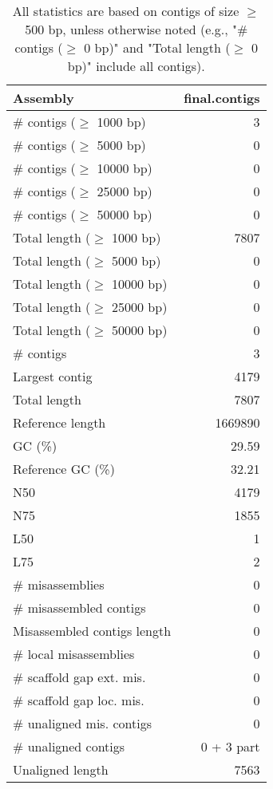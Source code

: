 \documentclass[12pt,a4paper]{article}
\begin{document}
\begin{table}[ht]
\begin{center}
\caption{All statistics are based on contigs of size $\geq$ 500 bp, unless otherwise noted (e.g., "\# contigs ($\geq$ 0 bp)" and "Total length ($\geq$ 0 bp)" include all contigs).}
\begin{tabular}{|l*{1}{|r}|}
\hline
Assembly & final.contigs \\ \hline
\# contigs ($\geq$ 1000 bp) & 3 \\ \hline
\# contigs ($\geq$ 5000 bp) & 0 \\ \hline
\# contigs ($\geq$ 10000 bp) & 0 \\ \hline
\# contigs ($\geq$ 25000 bp) & 0 \\ \hline
\# contigs ($\geq$ 50000 bp) & 0 \\ \hline
Total length ($\geq$ 1000 bp) & 7807 \\ \hline
Total length ($\geq$ 5000 bp) & 0 \\ \hline
Total length ($\geq$ 10000 bp) & 0 \\ \hline
Total length ($\geq$ 25000 bp) & 0 \\ \hline
Total length ($\geq$ 50000 bp) & 0 \\ \hline
\# contigs & 3 \\ \hline
Largest contig & 4179 \\ \hline
Total length & 7807 \\ \hline
Reference length & 1669890 \\ \hline
GC (\%) & 29.59 \\ \hline
Reference GC (\%) & 32.21 \\ \hline
N50 & 4179 \\ \hline
N75 & 1855 \\ \hline
L50 & 1 \\ \hline
L75 & 2 \\ \hline
\# misassemblies & 0 \\ \hline
\# misassembled contigs & 0 \\ \hline
Misassembled contigs length & 0 \\ \hline
\# local misassemblies & 0 \\ \hline
\# scaffold gap ext. mis. & 0 \\ \hline
\# scaffold gap loc. mis. & 0 \\ \hline
\# unaligned mis. contigs & 0 \\ \hline
\# unaligned contigs & 0 + 3 part \\ \hline
Unaligned length & 7563 \\ \hline

\end{tabular}
\end{center}
\end{table}
\end{document}
